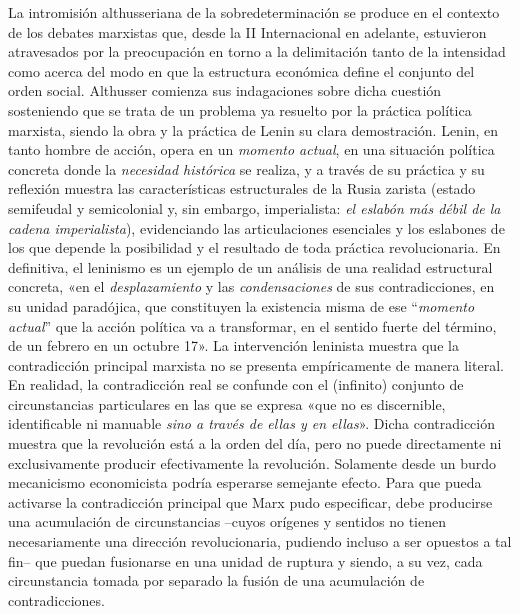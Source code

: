 La intromisión althusseriana de la sobredeterminación se produce en el contexto de los debates marxistas que, desde la II Internacional en adelante, estuvieron atravesados por la preocupación en torno a la delimitación tanto de la intensidad como acerca del modo en que la estructura económica define el conjunto del orden social. Althusser comienza sus indagaciones sobre dicha cuestión sosteniendo que se trata de un problema ya resuelto por la práctica política marxista, siendo la obra y la práctica de Lenin su clara demostración. Lenin, en tanto hombre de acción, opera en un \emph{momento actual}, en una situación política concreta donde la \emph{necesidad histórica} se realiza, y a través de su práctica y su reflexión muestra las características estructurales de la Rusia zarista (estado semifeudal y semicolonial y, sin embargo, imperialista: \emph{el eslabón más débil de la cadena imperialista}), evidenciando las articulaciones esenciales y los eslabones de los que depende la posibilidad y el resultado de toda práctica revolucionaria. En definitiva, el leninismo es un ejemplo de un análisis de una realidad estructural concreta, «en el \emph{desplazamiento} y las \emph{condensaciones} de sus contradicciones, en su unidad paradójica, que constituyen la existencia misma de ese ``\emph{momento actual}'' que la acción política va a transformar, en el sentido fuerte del término, de un febrero en un octubre 17». La intervención leninista muestra que la contradicción principal marxista no se presenta empíricamente de manera literal. En realidad, la contradicción real se confunde con el (infinito) conjunto de circunstancias particulares en las que se expresa «que no es discernible, identificable ni manuable \emph{sino a través de ellas y en ellas}». Dicha contradicción muestra que la revolución está a la orden del día, pero no puede directamente ni exclusivamente producir efectivamente la revolución. Solamente desde un burdo mecanicismo economicista podría esperarse semejante efecto. Para que pueda activarse la contradicción principal que Marx pudo especificar, debe producirse una acumulación de circunstancias --cuyos orígenes y sentidos no tienen necesariamente una dirección revolucionaria, pudiendo incluso a ser opuestos a tal fin-- que puedan fusionarse en una unidad de ruptura y siendo, a su vez, cada circunstancia tomada por separado la fusión de una acumulación de contradicciones.

